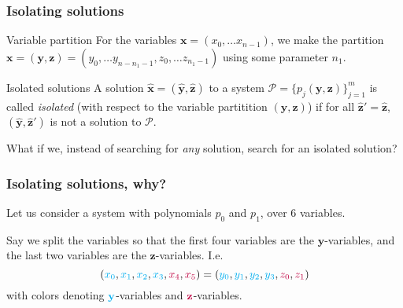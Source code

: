 \documentclass{beamer}
\begin{document}
\begin{frame}
    \frametitle{Isolating solutions}
    \begin{block}{Variable partition}
        For the variables $\mathbf{x} = (x_0, \dots x_{n - 1})$, we make the partition $\mathbf{x} = (\mathbf{y}, \mathbf{z}) = (y_0, \dots y_{n - n_1 - 1}, z_{0}, \dots z_{n_1 - 1})$ using some parameter $n_1$.
    \end{block}

    \begin{alertblock}{Isolated solutions}
        A solution $\hat{\mathbf{x}} = (\hat{\mathbf{y}},\hat{\mathbf{z}})$ to a system $\mathcal{P} = \{p_j(\mathbf{y}, \mathbf{z})\}^m_{j = 1}$ is called \textit{isolated} (with respect to the variable partitition $(\mathbf{y}, \mathbf{z})$) if for all $\hat{\mathbf{z}}'=\hat{\mathbf{z}}$, $(\hat{\mathbf{y}}, \hat{\mathbf{z}}')$ is not a solution to $\mathcal{P}$.
    \end{alertblock}
    What if we, instead of searching for \textit{any} solution, search for an isolated solution? 
\end{frame}

\begin{frame}
    \frametitle{Isolating solutions, why?}
    Let us consider a system with polynomials $p_0$ and $p_1$, over $6$ variables. 

    \pause
    Say we split the variables so that the first four variables are the $\mathbf{y}$-variables, and the last two variables are the $\mathbf{z}$-variables. I.e. 
    $$
        ({\color{cyan}x_0}, {\color{cyan}x_1}, {\color{cyan}x_2}, {\color{cyan}x_3}, {\color{purple}x_4}, {\color{purple}x_5}) = ({\color{cyan}y_0}, {\color{cyan}y_1}, {\color{cyan}y_2}, {\color{cyan}y_3}, {\color{purple}z_0}, {\color{purple}z_1})
    $$
    with colors denoting $\color{cyan}\mathbf{y}$-variables and $\color{purple}\mathbf{z}$-variables.
\end{frame}
\end{document}
